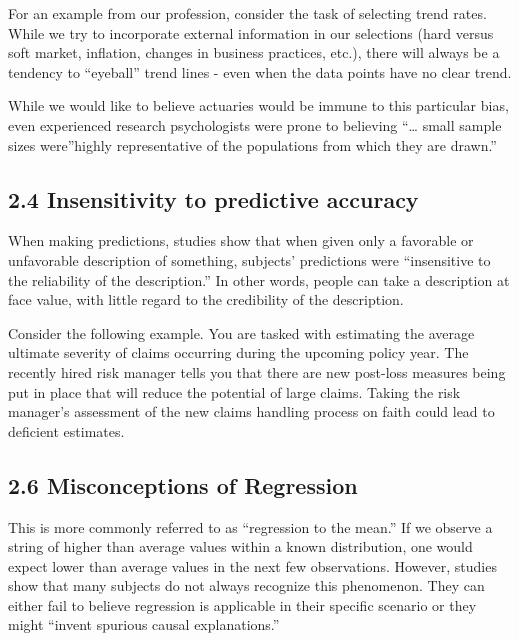 \documentclass[
]{article}
\begin{document}
For an example from our profession, consider the task of selecting trend
rates. While we try to incorporate external information in our
selections (hard versus soft market, inflation, changes in business
practices, etc.), there will always be a tendency to ``eyeball'' trend
lines - even when the data points have no clear trend.

While we would like to believe actuaries would be immune to this
particular bias, even experienced research psychologists were prone to
believing ``\ldots{} small sample sizes were''highly representative of
the populations from which they are drawn.''

\hypertarget{insensitivity-to-predictive-accuracy}{%
\subsection{2.4 Insensitivity to predictive
accuracy}\label{insensitivity-to-predictive-accuracy}}

When making predictions, studies show that when given only a favorable
or unfavorable description of something, subjects' predictions were
``insensitive to the reliability of the description.'' In other words,
people can take a description at face value, with little regard to the
credibility of the description.

Consider the following example. You are tasked with estimating the
average ultimate severity of claims occurring during the upcoming policy
year. The recently hired risk manager tells you that there are new
post-loss measures being put in place that will reduce the potential of
large claims. Taking the risk manager's assessment of the new claims
handling process on faith could lead to deficient estimates.

\hypertarget{misconceptions-of-regression}{%
\subsection{2.6 Misconceptions of
Regression}\label{misconceptions-of-regression}}

This is more commonly referred to as ``regression to the mean.'' If we
observe a string of higher than average values within a known
distribution, one would expect lower than average values in the next few
observations. However, studies show that many subjects do not always
recognize this phenomenon. They can either fail to believe regression is
applicable in their specific scenario or they might ``invent spurious
causal explanations.''
\end{document}
